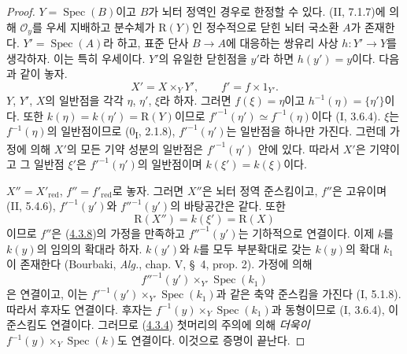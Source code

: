 \begin{proof}
$Y=\operatorname{Spec}(B)$이고 $B$가 뇌터 정역인 경우로 한정할 수
있다. (II, 7.1.7)에 의해 $\mathcal O_y$를 우세 지배하고 분수체가
$\mathrm R(Y)$인 정수적으로 닫힌 뇌터 국소환 $A$가 존재한다.
$Y'=\operatorname{Spec}(A)$라 하고, 표준 단사 $B\to A$에 대응하는
쌍유리 사상 $h:Y'\to Y$를 생각하자. 이는 특히 우세이다. $Y'$의
유일한 닫힌점을 $y'$라 하면 $h(y')=y$이다. 다음과 같이 놓자.
\[
X'=X\times_YY',\qquad f'=f\times1_{Y'}.
\]
$Y$, $Y'$, $X$의 일반점을 각각 $\eta$, $\eta'$, $\xi$라 하자.
그러면 $f(\xi)=\eta$이고 $h^{-1}(\eta)=\{\eta'\}$이다. 또한
$k(\eta)=k(\eta')=\mathrm R(Y)$이므로
$f'^{-1}(\eta')\simeq f^{-1}(\eta)$이다 (I, 3.6.4).
$\xi$는 $f^{-1}(\eta)$의 일반점이므로
(0\textsubscript{I}, 2.1.8), $f'^{-1}(\eta')$는 일반점을 하나만
가진다. 그런데 가정에 의해 $X'$의 모든 기약 성분의 일반점은
$f'^{-1}(\eta')$ 안에 있다. 따라서 $X'$은 기약이고 그 일반점
$\xi'$은 $f'^{-1}(\eta')$의 일반점이며
$k(\xi')=k(\xi)$이다.


$X''=X'_{\mathrm{red}}$, $f''=f'_{\mathrm{red}}$로 놓자. 그러면
$X''$은 뇌터 정역 준스킴이고, $f''$은 고유이며 (II, 5.4.6),
$f'^{-1}(y')$와 $f''^{-1}(y')$의 바탕공간은 같다. 또한
\[
\mathrm R(X'')=k(\xi')=\mathrm R(X)
\]
이므로 $f''$은 (\hyperref[III.4.3.8-fr]{4.3.8})의 가정을 만족하고
$f''^{-1}(y')$는 기하적으로 연결이다. 이제 $k$를 $k(y)$의 임의의
확대라 하자. $k(y')$와 $k$를 모두 부분확대로 갖는 $k(y)$의 확대
$k_1$이 존재한다 (Bourbaki, \emph{Alg.}, chap. V, \S~4, prop. 2).
가정에 의해
\[
f''^{-1}(y')\times_{Y'}\operatorname{Spec}(k_1)
\]
은 연결이고, 이는
$f'^{-1}(y')\times_{Y'}\operatorname{Spec}(k_1)$과 같은 축약
준스킴을 가진다 (I, 5.1.8). 따라서 후자도 연결이다. 후자는
$f^{-1}(y)\times_Y\operatorname{Spec}(k_1)$과 동형이므로
(I, 3.6.4), 이 준스킴도 연결이다. 그러므로
(\hyperref[III.4.3.4-fr]{4.3.4}) 첫머리의 주의에 의해
\emph{더욱이} $f^{-1}(y)\times_Y\operatorname{Spec}(k)$도 연결이다.
이것으로 증명이 끝난다.
\end{proof}


